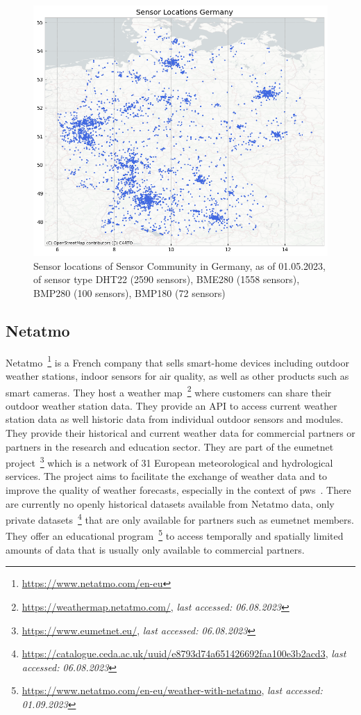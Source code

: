\begin{figure}[ht]
    \centering
    \includegraphics[width=1\textwidth]{images/sc_sensor_locations_germany.png}
    \caption{Sensor locations of Sensor Community in Germany, as of 01.05.2023, of sensor type DHT22 (2590 sensors), BME280 (1558 sensors), BMP280 (100 sensors), BMP180 (72 sensors)}
    \label{fig:sensor community sensor locations germany}
\end{figure}

\subsection{Netatmo}

Netatmo~\footnote{\url{https://www.netatmo.com/en-eu}} is a French company that sells smart-home devices including outdoor weather stations, indoor sensors for air quality, as well as other products such as smart cameras. They host a weather map~\footnote{\url{https://weathermap.netatmo.com/}, \textit{last accessed: 06.08.2023}} where customers can share their outdoor weather station data. They provide an API to access current weather station data as well historic data from individual outdoor sensors and modules.
They provide their historical and current weather data for commercial partners or partners in the research and education sector. They are part of the \gls{eumetnet} project~\footnote{\url{https://www.eumetnet.eu/}, \textit{last accessed: 06.08.2023}} which is a network of 31 European meteorological and hydrological services. The project aims to facilitate the exchange of weather data and to improve the quality of weather forecasts, especially in the context of \gls{pws}~\cite{hahn2022observations}. There are currently no openly historical datasets available from Netatmo data, only private datasets~\footnote{\url{https://catalogue.ceda.ac.uk/uuid/e8793d74a651426692faa100e3b2acd3}, \textit{last accessed: 06.08.2023}} that are only available for partners such as \gls{eumetnet} members. They offer an educational program~\footnote{\url{https://www.netatmo.com/en-eu/weather-with-netatmo}, \textit{last accessed: 01.09.2023}} to access temporally and spatially limited amounts of data that is usually only available to commercial partners.

